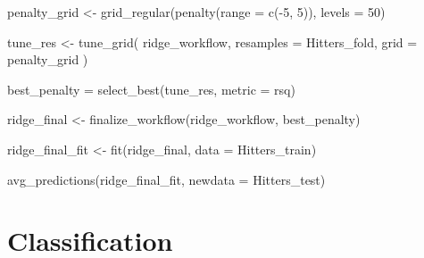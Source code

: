 \documentclass[
  letterpaper,
  DIV=11,
  numbers=noendperiod]{scrreprt}
\newenvironment{Shaded}{\begin{snugshade}}{\end{snugshade}}
\newcommand{\AttributeTok}[1]{\textcolor[rgb]{0.40,0.45,0.13}{#1}}
\newcommand{\DecValTok}[1]{\textcolor[rgb]{0.68,0.00,0.00}{#1}}
\newcommand{\FunctionTok}[1]{\textcolor[rgb]{0.28,0.35,0.67}{#1}}
\newcommand{\NormalTok}[1]{\textcolor[rgb]{0.00,0.23,0.31}{#1}}
\newcommand{\OtherTok}[1]{\textcolor[rgb]{0.00,0.23,0.31}{#1}}
\newcommand{\SpecialCharTok}[1]{\textcolor[rgb]{0.37,0.37,0.37}{#1}}
\newcommand{\StringTok}[1]{\textcolor[rgb]{0.13,0.47,0.30}{#1}}
\begin{document}
\begin{Shaded}
\begin{Highlighting}[]
\NormalTok{penalty\_grid }\OtherTok{\textless{}{-}} \FunctionTok{grid\_regular}\NormalTok{(}\FunctionTok{penalty}\NormalTok{(}\AttributeTok{range =} \FunctionTok{c}\NormalTok{(}\SpecialCharTok{{-}}\DecValTok{5}\NormalTok{, }\DecValTok{5}\NormalTok{)), }\AttributeTok{levels =} \DecValTok{50}\NormalTok{)}

\NormalTok{tune\_res }\OtherTok{\textless{}{-}} \FunctionTok{tune\_grid}\NormalTok{(}
\NormalTok{  ridge\_workflow,}
  \AttributeTok{resamples =}\NormalTok{ Hitters\_fold, }
  \AttributeTok{grid =}\NormalTok{ penalty\_grid}
\NormalTok{)}

\NormalTok{best\_penalty }\OtherTok{=} \FunctionTok{select\_best}\NormalTok{(tune\_res, }\AttributeTok{metric =} \StringTok{\textquotesingle{}rsq\textquotesingle{}}\NormalTok{)}

\NormalTok{ridge\_final }\OtherTok{\textless{}{-}} \FunctionTok{finalize\_workflow}\NormalTok{(ridge\_workflow, best\_penalty)}

\NormalTok{ridge\_final\_fit }\OtherTok{\textless{}{-}} \FunctionTok{fit}\NormalTok{(ridge\_final, }\AttributeTok{data =}\NormalTok{ Hitters\_train)}

\FunctionTok{avg\_predictions}\NormalTok{(ridge\_final\_fit, }\AttributeTok{newdata =}\NormalTok{ Hitters\_test)}
\end{Highlighting}
\end{Shaded}


\chapter{Classification}\label{classification}
\end{document}

